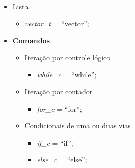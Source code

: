 \documentclass[12pt, a4paper]{IEEEtran}
\begin{document}
\begin{itemize}
  \begin{itemize}
  \item \textsf{Lista}
    \begin{itemize}
    \item \emph{vector\_t} = ``vector'';
    \end{itemize}
  \end{itemize}
\end{itemize}

\begin{itemize}
\item \textbf{Comandos}
  \begin{itemize}
  \item \textsf{Iteração por controle lógico}
    \begin{itemize}
    \item \emph{while\_c} = ``while'';
    \end{itemize}
  \end{itemize}

  \begin{itemize}
  \item \textsf{Iteração por contador}
    \begin{itemize}
    \item \emph{for\_c} = ``for'';
    \end{itemize}
  \end{itemize}

  \begin{itemize}
  \item \textsf{Condicionais de uma ou duas vias}
    \begin{itemize}
    \item \emph{if\_c} = ``if'';
    \item \emph{else\_c} = ``else'';
    \end{itemize}
  \end{itemize}
\end{itemize}
\end{document}
